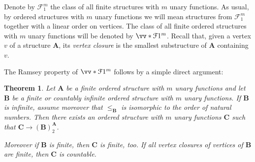 \documentclass{elsarticle}
\def\ordclasssup#1#2{\vv*{#1}{#2}}
\def\str#1{\mathbf {#1}}
\theoremstyle{plain}
\newtheorem{theorem}{Theorem}[section]
\theoremstyle{definition}
\theoremstyle{remark}
\begin{document}
Denote by $\mathcal F^m_1$ the class of all finite structures with $m$ unary functions. As usual, by ordered structures with $m$ unary functions we will mean structures from $\mathcal F^m_1$ together with a linear order on vertices.
The class of all finite ordered structures with $m$ unary functions will be denoted by $\ordclasssup{\mathcal F}{1}^m$. Recall that, given a vertex $v$ of a structure $\str{A}$, its \emph{vertex closure} is the smallest substructure of $\str{A}$ containing~$v$. 

The Ramsey property of $\ordclasssup{\mathcal F}{1}^m$ follows by a simple direct
argument:

\begin{theorem}
\label{thm:unaryfunc}
Let $\str{A}$ be a finite ordered structure with $m$ unary functions and let
$\str{B}$ be a finite or countably infinite ordered structure with $m$ unary functions.
If $\str{B}$ is infinite, assume moreover that $\leq_\str{B}$ is isomorphic to the order of natural numbers.
Then there exists an ordered structure with $m$ unary functions $\str{C}$ such that
$\str{C}\longrightarrow (\str{B})^\str{A}_2$.

Moreover if $\str{B}$ is finite, then
$\str{C}$ is finite, too. If all vertex closures of vertices of $\str{B}$ are finite, then $\str{C}$
is countable.
\end{theorem}
\end{document}
